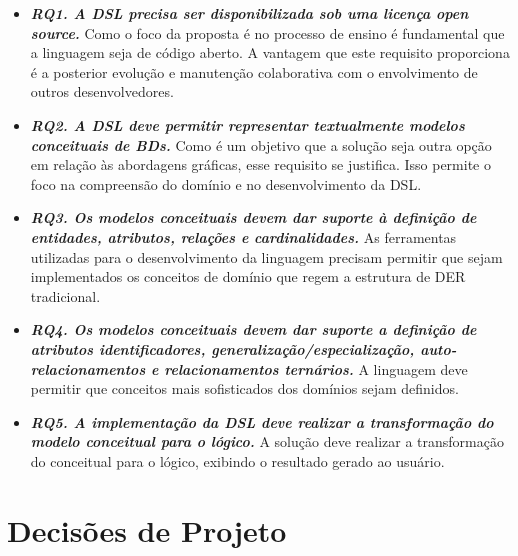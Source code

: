 \begin{itemize}

\item\textit{\textbf{RQ1. A \ac{DSL} precisa ser disponibilizada sob uma licença open source.}} 
Como o foco da proposta é no processo de ensino é fundamental que a linguagem seja de código aberto. 
A vantagem que este requisito proporciona é a posterior evolução e manutenção colaborativa com o envolvimento de outros desenvolvedores.

\item\textit{\textbf{RQ2. A \ac{DSL} deve permitir representar textualmente modelos conceituais de \acp{BD}.}} 
Como é um objetivo que a solução seja outra opção em relação às abordagens gráficas, esse requisito se justifica. 
Isso permite o foco na compreensão do domínio e no desenvolvimento da \ac{DSL}.

\item\textit{\textbf{RQ3. Os modelos conceituais devem dar suporte à definição de entidades, atributos, relações e cardinalidades.}} 
As ferramentas utilizadas para o desenvolvimento da linguagem precisam permitir que sejam implementados os conceitos de domínio que regem a estrutura de \ac{DER} tradicional.

\item\textit{\textbf{RQ4. Os modelos conceituais devem dar suporte a definição de atributos identificadores, generalização/especialização, auto-relacionamentos e relacionamentos ternários.}} 
A linguagem deve permitir que conceitos mais sofisticados dos domínios sejam definidos.

\item\textit{\textbf{RQ5. A implementação da \ac{DSL} deve realizar a transformação do modelo conceitual para o lógico.}} 
A solução deve realizar a transformação do conceitual para o lógico, exibindo o resultado gerado ao usuário.


\end{itemize}

\section{Decisões de Projeto} \label{sec:decDSL}

